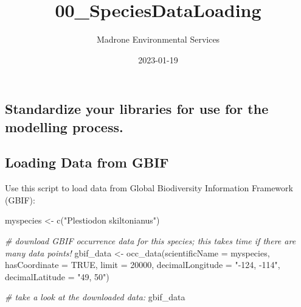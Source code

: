 \documentclass[
]{article}
\title{00\_SpeciesDataLoading}
\author{Madrone Environmental Services}
\date{2023-01-19}
\newenvironment{Shaded}{\begin{snugshade}}{\end{snugshade}}
\newcommand{\AttributeTok}[1]{\textcolor[rgb]{0.77,0.63,0.00}{#1}}
\newcommand{\CommentTok}[1]{\textcolor[rgb]{0.56,0.35,0.01}{\textit{#1}}}
\newcommand{\ConstantTok}[1]{\textcolor[rgb]{0.00,0.00,0.00}{#1}}
\newcommand{\DecValTok}[1]{\textcolor[rgb]{0.00,0.00,0.81}{#1}}
\newcommand{\FunctionTok}[1]{\textcolor[rgb]{0.00,0.00,0.00}{#1}}
\newcommand{\NormalTok}[1]{#1}
\newcommand{\OtherTok}[1]{\textcolor[rgb]{0.56,0.35,0.01}{#1}}
\newcommand{\SpecialCharTok}[1]{\textcolor[rgb]{0.00,0.00,0.00}{#1}}
\newcommand{\StringTok}[1]{\textcolor[rgb]{0.31,0.60,0.02}{#1}}
\begin{document}
\maketitle

\begin{Shaded}
\end{Shaded}

\hypertarget{standardize-your-libraries-for-use-for-the-modelling-process.}{%
\subsection{Standardize your libraries for use for the modelling
process.}\label{standardize-your-libraries-for-use-for-the-modelling-process.}}

\hypertarget{loading-data-from-gbif}{%
\subsection{Loading Data from GBIF}\label{loading-data-from-gbif}}

Use this script to load data from Global Biodiversity Information
Framework (GBIF):

\begin{Shaded}
\begin{Highlighting}[]
\NormalTok{myspecies }\OtherTok{\textless{}{-}} \FunctionTok{c}\NormalTok{(}\StringTok{"Plestiodon skiltonianus"}\NormalTok{)}

\CommentTok{\# download GBIF occurrence data for this species; this takes time if there are many data points!}
\NormalTok{gbif\_data }\OtherTok{\textless{}{-}} \FunctionTok{occ\_data}\NormalTok{(}\AttributeTok{scientificName =}\NormalTok{ myspecies, }\AttributeTok{hasCoordinate =} \ConstantTok{TRUE}\NormalTok{, }\AttributeTok{limit =} \DecValTok{20000}\NormalTok{, }\AttributeTok{decimalLongitude =} \StringTok{"{-}124, {-}114"}\NormalTok{, }\AttributeTok{decimalLatitude =} \StringTok{"49, 50"}\NormalTok{)}

\CommentTok{\# take a look at the downloaded data:}
\NormalTok{gbif\_data}
\end{Highlighting}
\end{Shaded}
\end{document}
